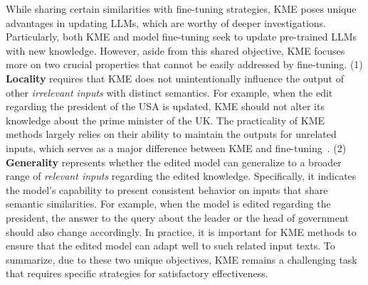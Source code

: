 \documentclass[acmsmall, screen]{acmart}
\begin{document}
While sharing certain similarities with fine-tuning strategies, KME poses unique advantages in updating LLMs, which are worthy of deeper investigations. Particularly, both KME and model fine-tuning seek to update pre-trained LLMs with new knowledge. However, 
aside from this shared objective, 
KME focuses more on two crucial properties that cannot be easily addressed by fine-tuning. 
{(1) \textbf{Locality} requires that KME does not unintentionally influence the output of other \textit{irrelevant inputs} with distinct semantics. For example, when the edit regarding the president of the USA is updated, KME should not alter its knowledge about the prime minister of the UK. 
The practicality of KME methods largely relies on their ability to maintain the outputs for unrelated inputs, which serves as a major difference between KME and fine-tuning~\cite{qin2022exploring}. }
(2) \textbf{Generality} represents whether the edited model can generalize to a broader range of \textit{relevant inputs} regarding the edited knowledge.
Specifically, it indicates the model's capability to present consistent behavior on inputs that share semantic similarities. {For example, when the model is edited regarding the president, the answer to the query about the leader or the head of government should also change accordingly.}
In practice, it is important for KME methods to ensure that the edited model can adapt well to such related input texts. %
To summarize, due to these two unique objectives, KME remains a challenging task that requires specific strategies for satisfactory effectiveness.


\end{document}
